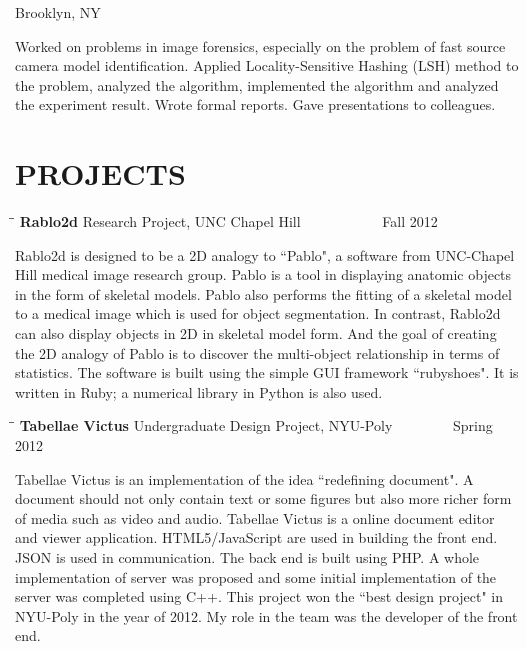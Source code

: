 \documentclass{res}
\begin{document}
\begin{resume}
\begin{tabbing}
                             \>Brooklyn, NY
   \end{tabbing}\vspace{-15pt}      %
     Worked on problems in image forensics, especially on the problem of fast source camera model identification. Applied Locality-Sensitive Hashing (LSH) method to the problem, analyzed the algorithm, implemented the algorithm and analyzed the experiment result. Wrote formal reports. Gave presentations to colleagues.\\

\section{PROJECTS}
   \vspace{-0.015in}	
   \begin{tabbing}
   \hspace{2.3in}\= \hspace{2.6in}\= \kill %
    {\bf Rablo2d} \>Research Project, UNC Chapel Hill\> ~~~~~~~~~~~Fall 2012\\
   \end{tabbing}\vspace{-20pt}
   Rablo2d is designed to be a 2D analogy to ``Pablo", a software from UNC-Chapel Hill medical image research group. Pablo is a tool in displaying anatomic objects in the form of skeletal models. Pablo also performs the fitting of a skeletal model to a medical image which is used for object segmentation. In contrast, Rablo2d can also display objects in 2D in skeletal model form. And the goal of creating the 2D analogy of Pablo is to discover the multi-object relationship in terms of statistics. The software is built using the simple GUI framework ``rubyshoes". It is written in Ruby; a numerical library in Python is also used.
   \begin{tabbing}
   \hspace{2.3in}\= \hspace{2.6in}\= \kill %
    {\bf Tabellae Victus} \>Undergraduate Design Project, NYU-Poly\> ~~~~~~~~Spring 2012\\
   \end{tabbing}\vspace{-20pt}
   Tabellae Victus is an implementation of the idea ``redefining document". A document should not only contain text or some figures but also more richer form of media such as video and audio. Tabellae Victus is a online document editor and viewer application. HTML5/JavaScript are used in building the front end. JSON is used in communication. The back end is built using PHP. A whole implementation of server was proposed and some initial implementation of the server was completed using C++. This project won the ``best design project" in NYU-Poly in the year of 2012. My role in the team was the developer of the front end.

\end{resume}
\end{document}

